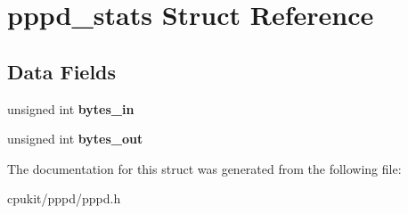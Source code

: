 \hypertarget{structpppd__stats}{}\section{pppd\+\_\+stats Struct Reference}
\label{structpppd__stats}
\subsection*{Data Fields}
\begin{DoxyCompactItemize}
\item 
\mbox{\label{structpppd__stats_a337a8ebe35a0a246f79adb173cb1d6b5}} 
unsigned int {\bfseries bytes\+\_\+in}
\item 
\mbox{\label{structpppd__stats_ab245146538b4683804d3d43c156f30b0}} 
unsigned int {\bfseries bytes\+\_\+out}
\end{DoxyCompactItemize}


The documentation for this struct was generated from the following file\+:\begin{DoxyCompactItemize}
\item 
cpukit/pppd/pppd.\+h\end{DoxyCompactItemize}
